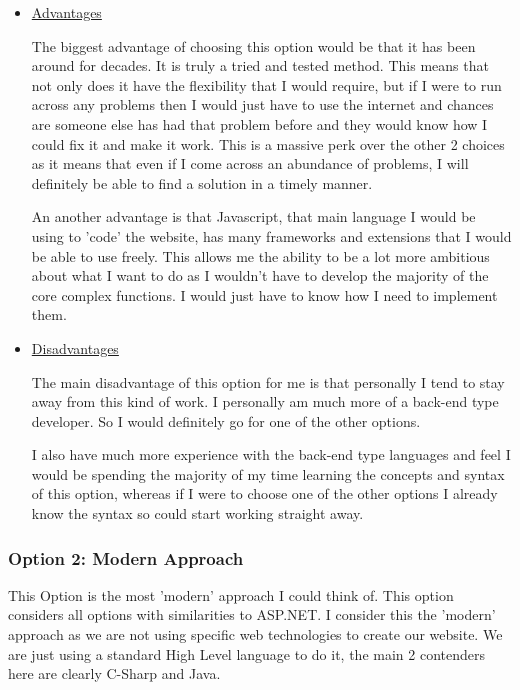 \begin{itemize}
\item{
\underline{Advantages}

The biggest advantage of choosing this option would be that it has been around for decades. It is truly a tried and tested method. This means that not only does it have the flexibility that I would require, but if I were to run across any problems then I would just have to use the internet and chances are someone else has had that problem before and they would know how I could fix it and make it work. This is a massive perk over the other 2 choices as it means that even if I come across an abundance of problems, I will definitely be able to find a solution in a timely manner.

An another advantage is that Javascript, that main language I would be using to 'code' the website, has many frameworks and extensions that I would be able to use freely. This allows me the ability to be a lot more ambitious about what I want to do as I wouldn't have to develop the majority of the core complex functions. I would just have to know how I need to implement them.  
}

\item{
\underline{Disadvantages}

The main disadvantage of this option for me is that personally I tend to stay away from this kind of work. I personally am much more of a back-end type developer. So I would definitely go for one of the other options.

I also have much more experience with the back-end type languages and feel I would be spending the majority of my time learning the concepts and syntax of this option, whereas if I were to choose one of the other options I already know the syntax so could start working straight away.
}
\end{itemize}

\subsubsection{Option 2: Modern Approach}

This Option is the most 'modern' approach I could think of. This option considers all options with similarities to ASP.NET. I consider this the 'modern' approach as we are not using specific web technologies to create our website. We are just using a standard High Level language to do it, the main 2 contenders here are clearly C-Sharp and Java.

